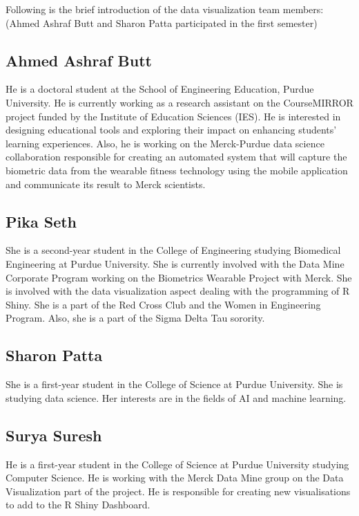 \documentclass[]{book}
\begin{document}
Following is the brief introduction of the data visualization team
members: (Ahmed Ashraf Butt and Sharon Patta participated in the first
semester)

\subsection{Ahmed Ashraf Butt}\label{ahmed-ashraf-butt}

He is a doctoral student at the School of Engineering Education, Purdue
University. He is currently working as a research assistant on the
CourseMIRROR project funded by the Institute of Education Sciences
(IES). He is interested in designing educational tools and exploring
their impact on enhancing students' learning experiences. Also, he is
working on the Merck-Purdue data science collaboration responsible for
creating an automated system that will capture the biometric data from
the wearable fitness technology using the mobile application and
communicate its result to Merck scientists.

\subsection{Pika Seth}\label{pika-seth}

She is a second-year student in the College of Engineering studying
Biomedical Engineering at Purdue University. She is currently involved
with the Data Mine Corporate Program working on the Biometrics Wearable
Project with Merck. She is involved with the data visualization aspect
dealing with the programming of R Shiny. She is a part of the Red Cross
Club and the Women in Engineering Program. Also, she is a part of the
Sigma Delta Tau sorority.

\subsection{Sharon Patta}\label{sharon-patta}

She is a first-year student in the College of Science at Purdue
University. She is studying data science. Her interests are in the
fields of AI and machine learning.

\subsection{Surya Suresh}\label{surya-suresh}

He is a first-year student in the College of Science at Purdue
University studying Computer Science. He is working with the Merck Data
Mine group on the Data Visualization part of the project. He is
responsible for creating new visualisations to add to the R Shiny
Dashboard.
\end{document}
